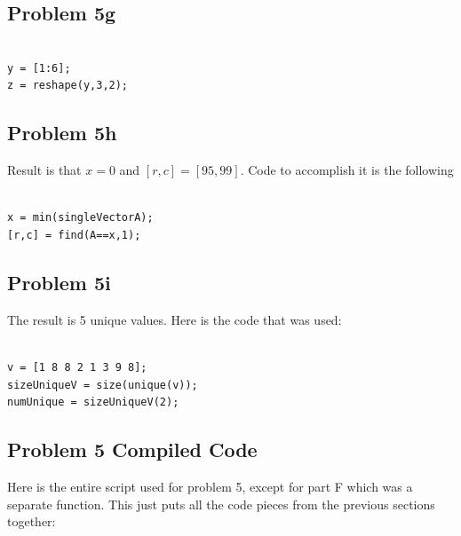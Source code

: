 \documentclass[11pt,psfig]{article}
\begin{document}
\subsection*{Problem 5g}

\begin{verbatim}

y = [1:6];
z = reshape(y,3,2);

\end{verbatim}

\subsection*{Problem 5h}

Result is that $x=0$ and $[r,c]=[95,99]$. Code to accomplish it is the following

\begin{verbatim}

x = min(singleVectorA);
[r,c] = find(A==x,1);

\end{verbatim}

\subsection*{Problem 5i}

The result is 5 unique values. Here is the code that was used:

\begin{verbatim}

v = [1 8 8 2 1 3 9 8];
sizeUniqueV = size(unique(v));
numUnique = sizeUniqueV(2);

\end{verbatim}

\subsection*{Problem 5 Compiled Code}

Here is the entire script used for problem 5, except for part F which was a separate function. This just puts all the code pieces from the previous sections together:
\end{document}
